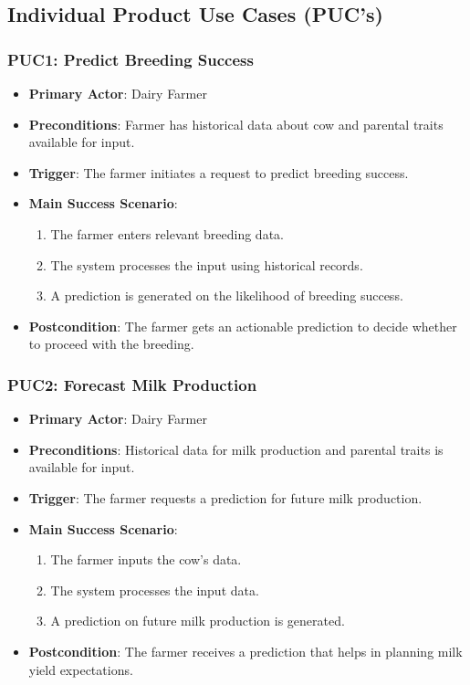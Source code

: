 \documentclass[12pt]{article}
\begin{document}
\subsection{Individual Product Use Cases (PUC's)}

\subsubsection{PUC1: Predict Breeding Success}
\begin{itemize}
    \item \textbf{Primary Actor}: Dairy Farmer
    \item \textbf{Preconditions}: Farmer has historical data about cow and 
    parental traits available for input.
    \item \textbf{Trigger}: The farmer initiates a request to predict 
    breeding success.
    \item \textbf{Main Success Scenario}:
    \begin{enumerate}
        \item The farmer enters relevant breeding data.
        \item The system processes the input using historical records.
        \item A prediction is generated on the likelihood of breeding success.
    \end{enumerate}
    \item \textbf{Postcondition}: The farmer gets an actionable prediction 
    to decide whether to proceed with the breeding.
\end{itemize}

\subsubsection{PUC2: Forecast Milk Production}
\begin{itemize}
    \item \textbf{Primary Actor}: Dairy Farmer
    \item \textbf{Preconditions}: Historical data for milk production and 
    parental traits is available for input.
    \item \textbf{Trigger}: The farmer requests a prediction for future milk 
    production.
    \item \textbf{Main Success Scenario}:
    \begin{enumerate}
        \item The farmer inputs the cow's data.
        \item The system processes the input data.
        \item A prediction on future milk production is generated.
    \end{enumerate}
    \item \textbf{Postcondition}: The farmer receives a prediction that helps 
    in planning milk yield expectations.
\end{itemize}
\end{document}
